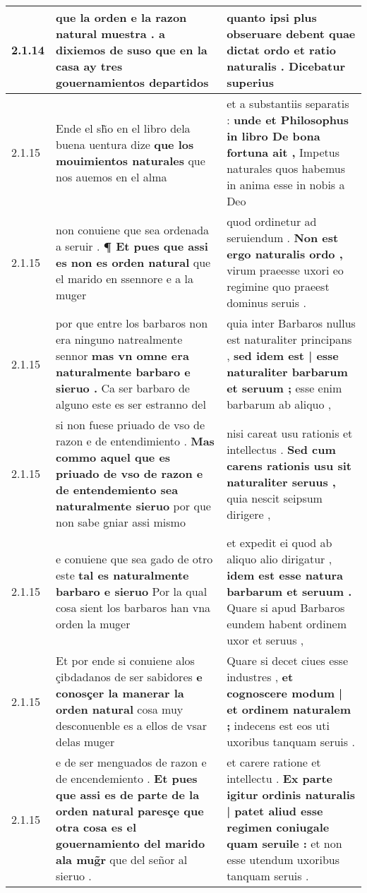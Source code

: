 \begin{tabular}{|p{1cm}|p{6.5cm}|p{6.5cm}|}
2.1.14 & que la orden \textbf{ e la razon natural muestra . } a dixiemos de suso que en la casa ay tres gouernamientos departidos & quanto ipsi plus obseruare debent \textbf{ quae dictat ordo et ratio naturalis . } Dicebatur superius \\\hline
2.1.15 & Ende el sh̃o en el libro dela buena uentura dize \textbf{ que los mouimientos naturales } que nos auemos en el alma & et a substantiis separatis : \textbf{ unde et Philosophus in libro De bona fortuna ait , } Impetus naturales quos habemus in anima esse in nobis a Deo \\\hline
2.1.15 & non conuiene que sea ordenada a seruir . \textbf{ ¶ Et pues que assi es non es orden natural } que el marido en ssennore e a la muger & quod ordinetur ad seruiendum . \textbf{ Non est ergo naturalis ordo , } virum praeesse uxori eo regimine quo praeest dominus seruis . \\\hline
2.1.15 & por que entre los barbaros non era ninguno natrealmente sennor \textbf{ mas vn omne era naturalmente barbaro e sieruo . } Ca ser barbaro de alguno este es ser estranno del & quia inter Barbaros nullus est naturaliter principans , \textbf{ sed idem est | esse naturaliter barbarum et seruum ; } esse enim barbarum ab aliquo , \\\hline
2.1.15 & si non fuese priuado de vso de razon e de entendimiento . \textbf{ Mas commo aquel que es priuado de vso de razon e de entendemiento sea naturalmente sieruo } por que non sabe gniar assi mismo & nisi careat usu rationis et intellectus . \textbf{ Sed cum carens rationis usu sit naturaliter seruus , } quia nescit seipsum dirigere , \\\hline
2.1.15 & e conuiene que sea gado de otro este \textbf{ tal es naturalmente barbaro e sieruo } Por la qual cosa sient los barbaros han vna orden la muger & et expedit ei quod ab aliquo alio dirigatur , \textbf{ idem est esse natura barbarum et seruum . } Quare si apud Barbaros eundem habent ordinem uxor et seruus , \\\hline
2.1.15 & Et por ende si conuiene alos çibdadanos de ser sabidores \textbf{ e conosçer la manerar la orden natural } cosa muy desconuenble es a ellos de vsar delas muger & Quare si decet ciues esse industres , \textbf{ et cognoscere modum | et ordinem naturalem ; } indecens est eos uti uxoribus tanquam seruis . \\\hline
2.1.15 & e de ser menguados de razon e de encendemiento . \textbf{ Et pues que assi es de parte de la orden natural paresçe que otra cosa es el gouernamiento del marido ala mug̃r } que del señor al sieruo . & et carere ratione et intellectu . \textbf{ Ex parte igitur ordinis naturalis | patet aliud esse regimen coniugale quam seruile : } et non esse utendum uxoribus tanquam seruis . \\\hline

\end{tabular}
